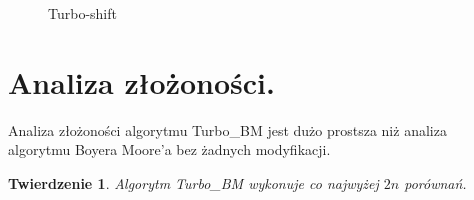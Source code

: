 \documentclass[12pt]{article}
\newcommand{\TBM}{Turbo\_BM }
\theoremstyle{plain}
\newtheorem*{theorem-thm*}{Twierdzenie}
\begin{document}
\begin{figure}[h]
		
  \caption{Turbo-shift}
  \label{turboshift}
\end{figure}
  
\section*{Analiza złożoności.}

Analiza złożoności algorytmu \TBM jest dużo prostsza niż analiza algorytmu Boyera Moore'a bez żadnych modyfikacji.

\begin{theorem-thm*}
	Algorytm \TBM wykonuje co najwyżej $2n$ porównań.
\end{theorem-thm*}
\end{document}
